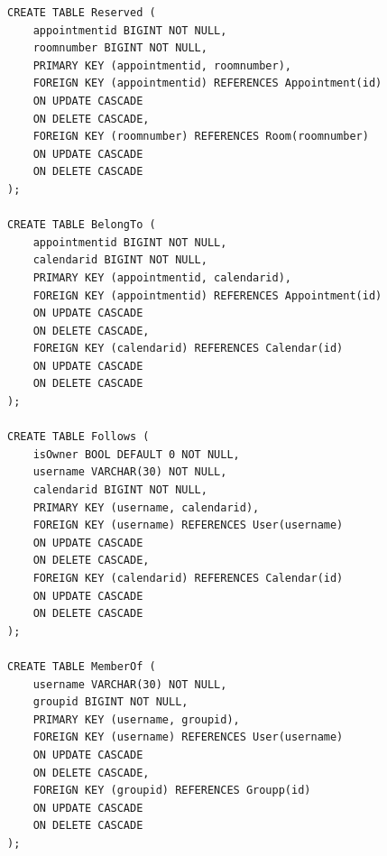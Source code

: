 \documentclass[titlepage]{article}
\begin{document}
\begin{lstlisting}
CREATE TABLE Reserved (
	appointmentid BIGINT NOT NULL,
	roomnumber BIGINT NOT NULL,
	PRIMARY KEY (appointmentid, roomnumber),
	FOREIGN KEY (appointmentid) REFERENCES Appointment(id)
	ON UPDATE CASCADE
	ON DELETE CASCADE,
	FOREIGN KEY (roomnumber) REFERENCES Room(roomnumber)
	ON UPDATE CASCADE
	ON DELETE CASCADE
);

CREATE TABLE BelongTo (
	appointmentid BIGINT NOT NULL,
	calendarid BIGINT NOT NULL,
	PRIMARY KEY (appointmentid, calendarid),
	FOREIGN KEY (appointmentid) REFERENCES Appointment(id)
	ON UPDATE CASCADE
	ON DELETE CASCADE,
	FOREIGN KEY (calendarid) REFERENCES Calendar(id)
	ON UPDATE CASCADE
	ON DELETE CASCADE
);

CREATE TABLE Follows (
	isOwner BOOL DEFAULT 0 NOT NULL,
	username VARCHAR(30) NOT NULL,
	calendarid BIGINT NOT NULL,
	PRIMARY KEY (username, calendarid),
	FOREIGN KEY (username) REFERENCES User(username)
	ON UPDATE CASCADE
	ON DELETE CASCADE,
	FOREIGN KEY (calendarid) REFERENCES Calendar(id)
	ON UPDATE CASCADE
	ON DELETE CASCADE
);

CREATE TABLE MemberOf (
	username VARCHAR(30) NOT NULL,
	groupid BIGINT NOT NULL,
	PRIMARY KEY (username, groupid),
	FOREIGN KEY (username) REFERENCES User(username)
	ON UPDATE CASCADE
	ON DELETE CASCADE,
	FOREIGN KEY (groupid) REFERENCES Groupp(id)
	ON UPDATE CASCADE
	ON DELETE CASCADE
);

\end{lstlisting}
\end{document}
